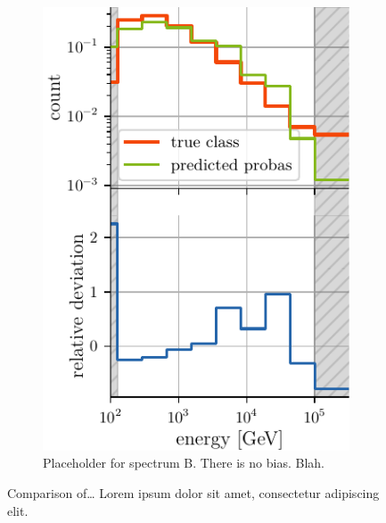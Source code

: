 \begin{figure}[H]
\begin{subfigure}{0.45\textwidth}
        \includegraphics[width=\textwidth]{content/plots/bootstrap:spectrum_half.pdf}
        \caption{
            Placeholder for spectrum B.
            There is no bias. Blah.
        }
    \end{subfigure}
    \caption{
        Comparison of…
        Lorem ipsum dolor sit amet, consectetur adipiscing elit.
    }
    \label{fig:bias_comparison}
\end{figure}
